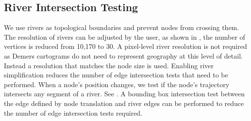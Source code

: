 \begin{algorithm}[tb!]
\end{algorithm}



\subsection{River Intersection Testing}

We use rivers as topological boundaries and prevent nodes from crossing them. The resolution of rivers can be adjusted by the user, as shown in , the number of vertices is reduced from 10,170 to 30. A pixel-level river resolution is not required as Demers cartograms do not need to represent geography at this level of detail. Instead a resolution that matches the node size is used. Enabling river simplification reduces the number of edge intersection tests that need to be performed. When a node's position changes, we test if the node's trajectory intersects any segment of a river. See . A bounding box intersection test between the edge defined by node translation and river edges can be performed to reduce the number of edge intersection tests required.


